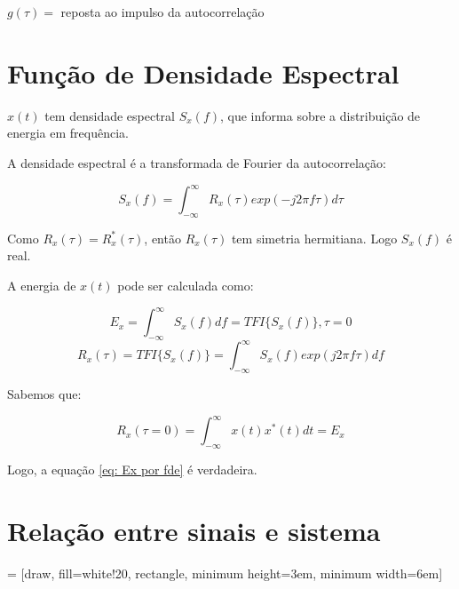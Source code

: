 \documentclass[12pt]{book}
\begin{document}
$g(\tau) = $ reposta ao impulso da autocorrelação

\section{Função de Densidade Espectral}

$x(t)$ tem densidade espectral $S_x(f)$, que informa sobre a distribuição de energia em frequência.

A densidade espectral é a transformada de Fourier da autocorrelação:

\begin{equation}
S_x(f) = \int_{-\infty}^{\infty}R_x(\tau)exp(-j 2 \pi f \tau) d\tau
\end{equation}

Como $R_x(\tau) = R_x^*(\tau)$, então $R_x(\tau)$ tem simetria hermitiana. Logo $S_x(f)$ é real.

A energia de $x(t)$ pode ser calculada como:

\begin{equation}
\label{eq: Ex por fde}
E_x = \int_{-\infty}^{\infty}S_x(f)df = TFI\{ S_x(f)\}, \tau = 0
\end{equation}
\begin{equation}
R_x(\tau) = TFI\{ S_x(f)\} = \int_{-\infty}^{\infty}S_x(f)exp(j2\pi f\tau)df
\end{equation}

Sabemos que:

\begin{equation}
R_x(\tau = 0) = \int_{-\infty}^{\infty}x(t)x^*(t)dt = E_x
\end{equation}

Logo, a equação \ref{eq: Ex por fde} é verdadeira.

\section{Relação entre sinais e sistema}

 = [draw, fill=white!20, rectangle, 
    minimum height=3em, minimum width=6em]
\begin{center}
\end{center}
\end{document}

